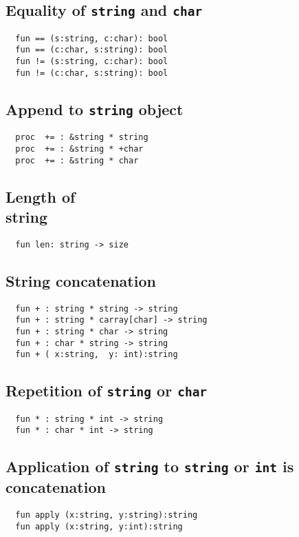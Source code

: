 \documentclass[oneside]{book}
\begin{document}
{\subsection{Equality of {\tt string} and {\tt char}}
\begin{verbatim}
  fun == (s:string, c:char): bool
  fun == (c:char, s:string): bool
  fun != (s:string, c:char): bool
  fun != (c:char, s:string): bool
\end{verbatim}

\subsection{Append to {\tt string} object}
\begin{verbatim}
  proc  += : &string * string 
  proc  += : &string * +char
  proc  += : &string * char
\end{verbatim}

\subsection{Length of {\\ string}}
\begin{verbatim}
  fun len: string -> size
\end{verbatim}

\subsection{String concatenation}
\begin{verbatim}
  fun + : string * string -> string
  fun + : string * carray[char] -> string
  fun + : string * char -> string
  fun + : char * string -> string
  fun + ( x:string,  y: int):string
\end{verbatim}

\subsection{Repetition of {\tt string} or {\tt char}}
\begin{verbatim}
  fun * : string * int -> string
  fun * : char * int -> string
\end{verbatim}

\subsection{Application of {\tt string} to {\tt string} or {\tt int} is concatenation}
\begin{verbatim}
  fun apply (x:string, y:string):string
  fun apply (x:string, y:int):string
\end{verbatim}

}
\end{document}
